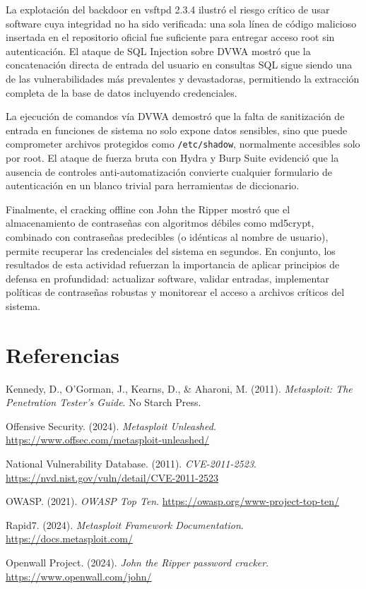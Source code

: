 \documentclass[12pt, letterpaper]{article}
\begin{document}
La explotación del backdoor en vsftpd 2.3.4 ilustró el riesgo crítico de usar software cuya integridad no ha sido verificada: una sola línea de código malicioso insertada en el repositorio oficial fue suficiente para entregar acceso root sin autenticación. El ataque de SQL Injection sobre DVWA mostró que la concatenación directa de entrada del usuario en consultas SQL sigue siendo una de las vulnerabilidades más prevalentes y devastadoras, permitiendo la extracción completa de la base de datos incluyendo credenciales.

La ejecución de comandos vía DVWA demostró que la falta de sanitización de entrada en funciones de sistema no solo expone datos sensibles, sino que puede comprometer archivos protegidos como \texttt{/etc/shadow}, normalmente accesibles solo por root. El ataque de fuerza bruta con Hydra y Burp Suite evidenció que la ausencia de controles anti-automatización convierte cualquier formulario de autenticación en un blanco trivial para herramientas de diccionario.

Finalmente, el cracking offline con John the Ripper mostró que el almacenamiento de contraseñas con algoritmos débiles como md5crypt, combinado con contraseñas predecibles (o idénticas al nombre de usuario), permite recuperar las credenciales del sistema en segundos. En conjunto, los resultados de esta actividad refuerzan la importancia de aplicar principios de defensa en profundidad: actualizar software, validar entradas, implementar políticas de contraseñas robustas y monitorear el acceso a archivos críticos del sistema.

\section{Referencias}

\begin{list}{}{\leftmargin=1.27cm \itemindent=-1.27cm \itemsep=0pt \parsep=0pt}
  \item Kennedy, D., O'Gorman, J., Kearns, D., \& Aharoni, M. (2011). \textit{Metasploit: The Penetration Tester's Guide}. No Starch Press.
  \item Offensive Security. (2024). \textit{Metasploit Unleashed}. \url{https://www.offsec.com/metasploit-unleashed/}
  \item National Vulnerability Database. (2011). \textit{CVE-2011-2523}. \url{https://nvd.nist.gov/vuln/detail/CVE-2011-2523}
  \item OWASP. (2021). \textit{OWASP Top Ten}. \url{https://owasp.org/www-project-top-ten/}
  \item Rapid7. (2024). \textit{Metasploit Framework Documentation}. \url{https://docs.metasploit.com/}
  \item Openwall Project. (2024). \textit{John the Ripper password cracker}. \url{https://www.openwall.com/john/}
\end{list}
\end{document}
